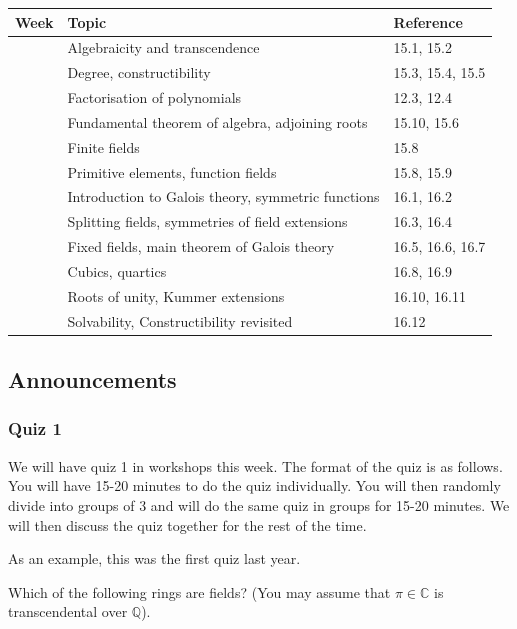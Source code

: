 \documentclass[11pt]{article}
\begin{document}
\begin{center}
\begin{tabular}{lll}
Week & Topic & Reference\\
\hline
 & Algebraicity and transcendence & 15.1, 15.2\\
 & Degree, constructibility & 15.3, 15.4, 15.5\\
 & Factorisation of polynomials & 12.3, 12.4\\
 & Fundamental theorem of algebra, adjoining roots & 15.10, 15.6\\
 & Finite fields & 15.8\\
 & Primitive elements, function fields & 15.8, 15.9\\
 & Introduction to Galois theory, symmetric functions & 16.1, 16.2\\
 & Splitting fields, symmetries of field extensions & 16.3, 16.4\\
 & Fixed fields, main theorem of Galois theory & 16.5, 16.6, 16.7\\
 & Cubics, quartics & 16.8, 16.9\\
 & Roots of unity, Kummer extensions & 16.10, 16.11\\
 & Solvability, Constructibility revisited & 16.12\\
\end{tabular}
\end{center}
\subsection{Announcements}
\label{sec:org719094a}
\subsubsection{Quiz 1}
\label{sec:org898ccb0}

We will have quiz 1 in workshops this week.  The format of the quiz is as follows.  You will have 15-20 minutes to do the quiz individually.  You will then randomly divide into groups of 3 and will do the same quiz in groups for 15-20 minutes.  We will then discuss the quiz together for the rest of the time.

As an example, this was the first quiz last year.

Which of the following rings are fields? (You may assume that \(\pi \in \mathbb{C}\) is transcendental over \(\mathbb{Q}\)).
\end{document}
